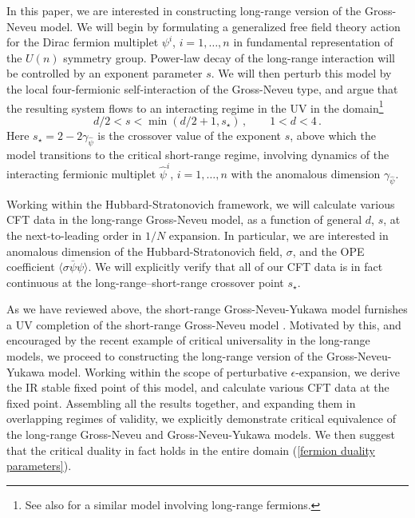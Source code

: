 \documentclass[aps,amsmath,amssymb,prd,showpacs,floatfix,preprint,superscriptaddress,nofootinbib,12pt]{article}
\begin{document}
In this paper, we are interested in constructing long-range version of the Gross-Neveu
model. We will begin by formulating a generalized free field theory action
for the Dirac fermion multiplet $\psi^i$, $i=1,\dots,n$ in fundamental representation of the $U(n)$ symmetry group.
Power-law decay of the long-range interaction will be controlled by an exponent parameter $s$.
We will then perturb this model by the local four-fermionic
self-interaction of the Gross-Neveu type, and argue that the resulting system
flows to an interacting regime in the UV in the domain\footnote{See also \cite{Giuliani:2020aot} for a similar
model involving long-range fermions.}
\begin{equation}
\label{fermion duality parameters}
d/2<s<\min(d/2+1,s_\star)\,,\qquad 1<d<4\,.
\end{equation}
Here $s_\star = 2-2\gamma_{\hat\psi}$ is the crossover value of the  exponent $s$,
above which the model transitions to the critical short-range regime, involving dynamics
of the interacting fermionic multiplet $\hat\psi^i$, $i=1,\dots,n$ with the anomalous
dimension $\gamma_{\hat\psi}$.


Working within the Hubbard-Stratonovich framework,
we will calculate various CFT data in the long-range Gross-Neveu model,
as a function of general $d$, $s$, at the next-to-leading 
order in $1/N$ expansion. In particular, we are interested in anomalous dimension
of the Hubbard-Stratonovich field, $\sigma$, and the OPE coefficient $\langle\sigma\bar\psi\psi\rangle$.
We will explicitly verify that all of our CFT data is in fact continuous
at the long-range--short-range crossover point $s_\star$.





As we have reviewed above, the short-range Gross-Neveu-Yukawa model furnishes
a UV completion of the short-range Gross-Neveu model \cite{Zinn-Justin:1991ksq}.
Motivated by this, and encouraged by the recent example \cite{Chakraborty:2021lwl}
of critical universality in the long-range models, we proceed to constructing
the long-range version of the Gross-Neveu-Yukawa model. Working within the scope
of perturbative $\epsilon$-expansion, we derive the IR stable fixed point of this model,
and calculate various CFT data at the fixed point.
Assembling all the results together, and expanding them in overlapping regimes
of validity, we explicitly demonstrate critical equivalence of the
long-range Gross-Neveu and Gross-Neveu-Yukawa models. We then suggest that the
critical duality in fact holds in the entire domain (\ref{fermion duality parameters}).\\
\end{document}
